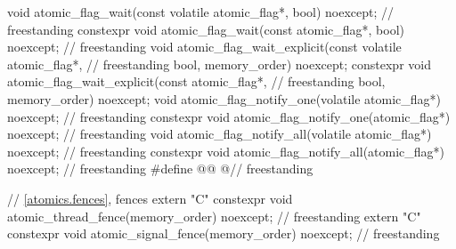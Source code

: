 \begin{codeblock}
{  void atomic_flag_wait(const volatile atomic_flag*, bool) noexcept;                // freestanding
  constexpr void atomic_flag_wait(const atomic_flag*, bool) noexcept;               // freestanding
  void atomic_flag_wait_explicit(const volatile atomic_flag*,                       // freestanding
                                 bool, memory_order) noexcept;
  constexpr void atomic_flag_wait_explicit(const atomic_flag*,                      // freestanding
                                 bool, memory_order) noexcept;
  void atomic_flag_notify_one(volatile atomic_flag*) noexcept;                      // freestanding
  constexpr void atomic_flag_notify_one(atomic_flag*) noexcept;                     // freestanding
  void atomic_flag_notify_all(volatile atomic_flag*) noexcept;                      // freestanding
  constexpr void atomic_flag_notify_all(atomic_flag*) noexcept;                     // freestanding
  #define @@ @\seebelownc@                                                // freestanding

  // \ref{atomics.fences}, fences
  extern "C" constexpr void atomic_thread_fence(memory_order) noexcept;             // freestanding
  extern "C" constexpr void atomic_signal_fence(memory_order) noexcept;             // freestanding
}
\end{codeblock}

